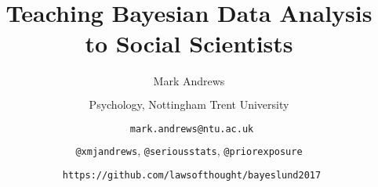 \documentclass{slides}
\title[Teaching Bayes]{Teaching Bayesian Data Analysis to Social Scientists}
\author[Andrews]{Mark Andrews \\ $\phantom{foo}$ \\ Psychology, Nottingham Trent University \\ $\phantom{foo}$ \\ \faEnvelopeO \  \texttt{mark.andrews@ntu.ac.uk} \\ $\phantom{foo}$ \\ \faTwitter \texttt{@xmjandrews}, \texttt{@seriousstats},  \texttt{@priorexposure} \\ $\phantom{foo}$ \\ \faGithub \ \texttt{https://github.com/lawsofthought/bayeslund2017}}
\date{}
\begin{document}
{
	\begin{frame}
		\titlepage
	\end{frame}
}




\end{document}
